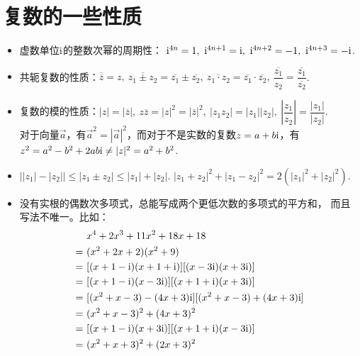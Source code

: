 \section{复数的一些性质}
\begin{itemize}[leftmargin=\inteval{\myitemleftmargin}pt,itemsep=
   \inteval{\myitemitempsep}pt,topsep=\inteval{\myitemtopsep}pt]
\item 虚数单位$ \mathrm{i} $的整数次幂的周期性：
$ \i^{4n}=1,\ \i^{4n+1}=\i,\ \i^{4n+2}=-1,\ \i^{4n+3}=-\i $.  

\item 共轭复数的性质：$ \overline{\overline{z}}=z,\ 
\overline{z_1\pm z_2}=\overline{z_1}\pm \overline{z_2},\ 
\overline{z_1\cdot z_2}=\overline{z_1}\cdot \overline{z_2},\ 
\overline{\dfrac{z_1}{z_2}}=\dfrac{\overline{z_1}}
{\overline{z_2}} $.  

\item 复数的模的性质：$ |z|=|\overline{z}|,\ z\overline{z}=
|z|^2=|\overline{z}|^2,\ |z_1z_2|=|z_1||z_2|,\ \left|\dfrac{z_1}{z_2}\right|=
\dfrac{|z_1|}{|z_2|} $. \\
对于向量$ \vec{a} $，有$ \vec{a}^2=
|\vec{a}|^2 $，而对于不是实数的复数$ z=a+b\mathrm{i} $，有
$ z^2=a^2-b^2+2ab\mathrm{i} \neq |z|^2=a^2+b^2 $. 

\item $ \left||z_1|-|z_2|\right|\leq |z_1\pm z_2|
\leq|z_1|+|z_2| $. \quad
$ |z_1+z_2|^2+|z_1-z_2|^2=2\left( |z_1|^2+|z_2|^2 \right) $. 

\item 没有实根的偶数次多项式，总能写成两个更低次数的多项式的平方和，
而且写法不唯一。比如：
\begin{align*}
 &\ x^4+2x^3+11x^2+18x+18 \\
=&\  (x^2+2x+2)(x^2+9)  \\
=&\  [(x+1-\mathrm{i})(x+1+\mathrm{i})][(x-3\mathrm{i})(x+3\mathrm{i})] \\
=&\  [(x+1-\mathrm{i})(x-3\mathrm{i})][(x+1+\mathrm{i})(x+3\mathrm{i})] \\
=&\  [(x^2+x-3)-(4x+3)\mathrm{i}][(x^2+x-3)+(4x+3)\mathrm{i}] \\
=&\  (x^2+x-3)^2+(4x+3)^2  \\
=&\  [(x+1-\mathrm{i})(x+3\mathrm{i})][(x+1+\mathrm{i})(x-3\mathrm{i})] \\
=&\  (x^2+x+3)^2+(2x+3)^2
\end{align*}


\end{itemize}
